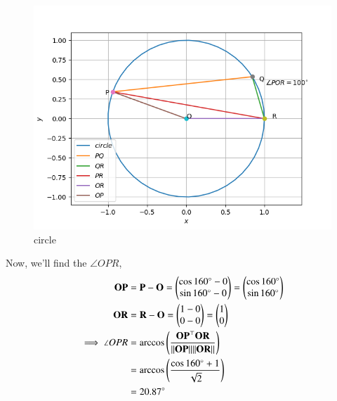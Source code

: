 \documentclass[journal,12pt,twocolumn]{IEEEtran}
\let\vec\mathbf
\begin{document}
\begin{figure}[!htb]
    \centering
    \includegraphics[width=\columnwidth]{figs/circle.png}
    \caption{circle}
    \label{fig:circle}
\end{figure}

Now, we'll find the $\angle{OPR}$,
\begin{align}
    \vec{OP} &= \vec{P} - \vec{O} = \myvec{\cos160\degree - 0 \\ \sin160\degree - 0} = \myvec{\cos160\degree \\ \sin160\degree} \\
    \vec{OR} &= \vec{R} - \vec{O} = \myvec{1 - 0 \\ 0 - 0} = \myvec{1 \\ 0} \\
    \implies \angle{OPR} &= \arccos\brak{\frac{\vec{OP}^\top \vec{OR}}{\norm{\vec{OP}} \norm{\vec{OR}}}} \\
    &= \arccos\brak{\frac{\cos160\degree + 1}{\sqrt{2}}} \\
    &= 20.87\degree
\end{align}
\end{document}

